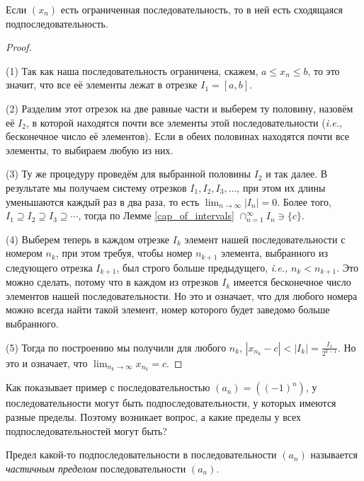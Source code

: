 \begin{theorem}\label{B-W}
    Если $(x_n)$ есть ограниченная последовательность, то в ней есть сходящаяся подпоследовательность.
\end{theorem}
\begin{proof}~

    (1) Так как наша последовательность ограничена, скажем, $a \le x_n \le b$, то это значит, что все её элементы лежат в отрезке $I_1 = [a,b]$.

    (2) Разделим этот отрезок на две равные части и выберем ту половину, назовём её $I_2$, в которой находятся почти все элементы этой последовательности (\textit{i.e.,} бесконечное число её элементов). Если в обеих половинах находятся почти все элементы, то выбираем любую из них.

    (3) Ту же процедуру проведём для выбранной половины $I_2$ и так далее. В результате мы получаем систему отрезков $I_1, I_2, I_3, \ldots$, при этом их длины уменьшаются каждый раз в два раза, то есть $\lim_{n \to \infty}|I_n| = 0$. Более того, $I_1 \supseteq I_2 \supseteq I_3 \supseteq \cdots$, тогда по Лемме \ref{cap_of_intervals} $\cap_{n=1}^\infty I_n \ni \{c\}.$

    (4) Выберем теперь в каждом отрезке $I_k$ элемент нашей последовательности с номером $n_k$, при этом требуя, чтобы номер $n_{k+1}$ элемента, выбранного из следующего отрезка $I_{k+1}$, был строго больше предыдущего, \textit{i.e.,} $n_k<n_{k+1}$. Это можно сделать, потому что в каждом из отрезков $I_k$ имеется бесконечное число элементов нашей последовательности. Но это и означает, что для любого номера можно всегда найти такой элемент, номер которого будет заведомо больше выбранного.

    (5) Тогда по построению мы получили для любого $n_k$, $|x_{n_k}-c| < |I_k| = \frac{I_1}{2^{k-1}}$. Но это и означает, что $\lim_{n_k \to \infty}x_{n_k} = c.$
\end{proof}

Как показывает пример с последовательностью $(a_n) =  ((-1)^n )$, у последовательности могут быть подпоследовательности, у которых имеются разные пределы. Поэтому возникает вопрос, а какие пределы у всех подпоследовательностей могут быть?

\begin{definition}
    Предел какой-то подпоследовательности в последовательности $(a_n)$ называется \textit{частичным пределом} последовательности $(a_n)$.
\end{definition}

